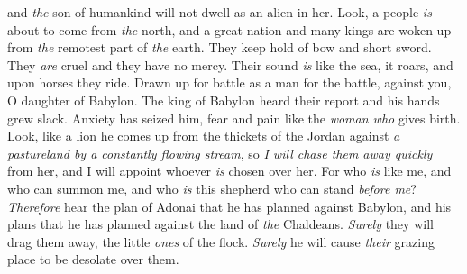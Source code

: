 \begin{biblechapter}
and \textit{the} son of humankind will not dwell as an alien in her.
\verse Look, a people \textit{is} about to come 
from \textit{the} north, 
and a great nation and many kings are woken up 
from \textit{the} remotest part of \textit{the} earth.
\verse They keep hold of bow and short sword. 
They \textit{are} cruel and they have no mercy. 
Their sound \textit{is} like the sea, it roars, 
and upon horses they ride. 
Drawn up for battle as a man for the battle, 
against you, O daughter of Babylon.
\verse The king of Babylon heard their report 
and his hands grew slack. 
Anxiety has seized him, 
fear and pain like the \textit{woman who} gives birth.
\verse Look, like a lion he comes up from the thickets of the Jordan 
against \textit{a pastureland by a constantly flowing stream}, 
so \textit{I will chase them away quickly} from her, 
and I will appoint whoever \textit{is} chosen over her. 
For who \textit{is} like me, and who can summon me, 
and who \textit{is} this shepherd who can stand \textit{before me}?
\verse \textit{Therefore} hear the plan of Adonai 
that he has planned against Babylon, 
and his plans 
that he has planned against the land of \textit{the} Chaldeans. 
\textit{Surely} they will drag them away, 
the little \textit{ones} of the flock. 
\textit{Surely} he will cause \textit{their} grazing place 
to be desolate over them.
\end{biblechapter}

